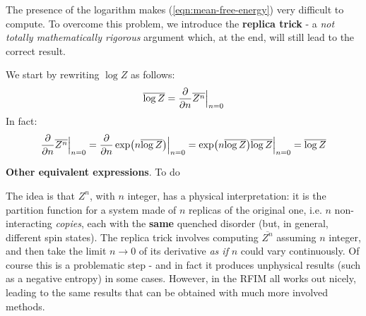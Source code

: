 \documentclass[../template.tex]{subfiles}
\begin{document}
\medskip

The presence of the logarithm makes (\ref{eqn:mean-free-energy}) very difficult to compute. To overcome this problem, we introduce the \textbf{replica trick} - a \textit{not totally mathematically rigorous} argument which, at the end, will still lead to the correct result.

We start by rewriting $\log Z$ as follows:
\begin{align} \label{eqn:replica-log}
    \overline{\log Z} = \pdv{n} \overline{Z^n} \Big|_{n=0}
\end{align}
In fact:
\begin{align*}
    \pdv{n} \overline{Z^n} \Big|_{n=0} = \pdv{n} \exp(n \overline{\log Z}) \Big|_{n = 0} = \exp(n \overline{\log Z}) \overline{\log Z} \Big|_{n=0} = \overline{\log Z}
\end{align*}


\begin{expl} \textbf{Other equivalent expressions}.  
    To do
\end{expl}

The idea is that $Z^n$, with $n$ integer, has a physical interpretation: it is the partition function for a system made of $n$ replicas of the original one, i.e. $n$ non-interacting \textit{copies}, each with the \textbf{same} quenched disorder (but, in general, different spin states). The replica trick involves computing $\overline{Z^n}$ assuming $n$ integer, and then take the limit $n \to 0$ of its derivative \textit{as if} $n$ could vary continuously. Of course this is a problematic step - and in fact it produces unphysical results (such as a negative entropy) in some cases. However, in the RFIM all works out nicely, leading to the same results that can be obtained with much more involved methods.

\medskip
\end{document}
